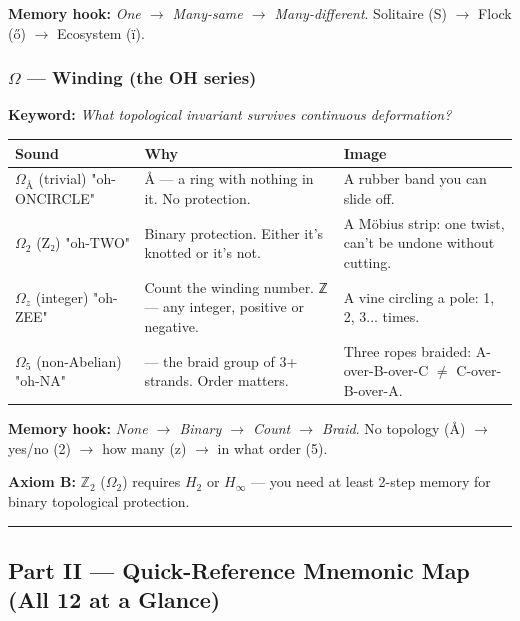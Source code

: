 \documentclass[12pt,a4paper]{article}
\begin{document}
\textbf{Memory hook:} \emph{One $\rightarrow$ Many-same $\rightarrow$ Many-different}. Solitaire (S) $\rightarrow$ Flock (ő) $\rightarrow$ Ecosystem (ï).

\subsubsection{$\Omega$ --- Winding (the \textbf{OH} series)}

\textbf{Keyword:} \emph{What topological invariant survives continuous deformation?}

\begin{table}[htbp]
\centering
\small
{}
\begin{tabularx}{\textwidth}{>{\centering\arraybackslash}X >{\centering\arraybackslash}X >{\centering\arraybackslash}X}
\toprule
\rowcolor{gray!25}\textbf{Sound} & \textbf{Why} & \textbf{Image} \\
\midrule
\rowcolors{1}{white}{gray!10}
\textbf{$\Omega_{\text{Å}}$} (trivial) "oh-ONCIRCLE" & Å --- a ring with nothing in it. No protection. & A rubber band you can slide off. \\
\textbf{$\Omega_{2}$} (Z₂) "oh-TWO" & Binary protection. Either it's knotted or it's not. & A Möbius strip: one twist, can't be undone without cutting. \\
\textbf{$\Omega_{z}$} (integer) "oh-ZEE" & Count the winding number. ℤ --- any integer, positive or negative. & A vine circling a pole: 1, 2, 3... times. \\
\textbf{$\Omega_{5}$} (non-Abelian) "oh-NA" & 5 --- the braid group of 3+ strands. Order matters. & Three ropes braided: A-over-B-over-C $\neq$ C-over-B-over-A. \\
\bottomrule
\end{tabularx}
\end{table}

\textbf{Memory hook:} \emph{None $\rightarrow$ Binary $\rightarrow$ Count $\rightarrow$ Braid}. No topology (Å) $\rightarrow$ yes/no (2) $\rightarrow$ how many (z) $\rightarrow$ in what order (5).

\textbf{Axiom B:} $\mathbb{Z}_2$ ($\Omega_2$) requires $H_2$ or $H_{\infty}$ --- you need at least 2-step memory for binary topological protection.

\begin{center}
\rule{0.5\textwidth}{0.4pt}
\end{center}

\subsection{Part II --- Quick-Reference Mnemonic Map (All 12 at a Glance)}
\end{document}
